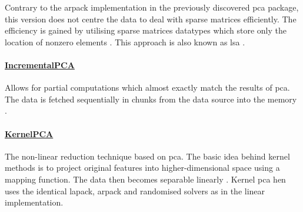 Contrary to the \acrshort{arpack} implementation in the previously discovered \gls{pca} package, this version does not centre the data  to deal with sparse matrices efficiently.
The efficiency is gained by utilising sparse matrices datatypes which store only the location of nonzero elements \cite{HandsOnMLCh1}.
This approach is also known as \gls{lsa} \cite{scikit-learn}.


\paragraph{\href{https://scikit-learn.org/stable/modules/generated/sklearn.decomposition.IncrementalPCA.html\#sklearn.decomposition.IncrementalPCA}{IncrementalPCA}}

Allows for partial computations which almost exactly match the results of \gls{pca}.
The data is fetched sequentially in chunks from the data source into the memory \cite{scikit-learn}.


\paragraph{\href{https://scikit-learn.org/stable/modules/generated/sklearn.decomposition.KernelPCA.html\#sklearn.decomposition.KernelPCA}{KernelPCA}}

The non-linear reduction technique based on \gls{pca}.
The basic idea behind kernel methods is to project original features into higher-dimensional space using a mapping function.
The data then becomes separable linearly \cite{PythonMachineLearningCh1}.
Kernel \gls{pca} hen uses the identical \acrshort{lapack}, \acrshort{arpack} and randomised solvers as in the linear implementation.


\clearpage
